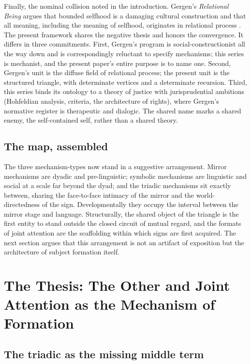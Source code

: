 Finally, the nominal collision noted in the introduction. Gergen's \emph{Relational Being} argues that bounded selfhood is a damaging cultural construction and that all meaning, including the meaning of selfhood, originates in relational process \parencite{gergen2009}. The present framework shares the negative thesis and honors the convergence. It differs in three commitments. First, Gergen's program is social-constructionist all the way down and is correspondingly reluctant to specify mechanisms; this series is mechanist, and the present paper's entire purpose is to name one. Second, Gergen's unit is the diffuse field of relational process; the present unit is the structured triangle, with determinate vertices and a determinate recursion. Third, this series binds its ontology to a theory of justice with jurisprudential ambitions (Hohfeldian analysis, criteria, the architecture of rights), where Gergen's normative register is therapeutic and dialogic. The shared name marks a shared enemy, the self-contained self, rather than a shared theory.

\subsection{The map, assembled}

The three mechanism-types now stand in a suggestive arrangement. Mirror mechanisms are dyadic and pre-linguistic; symbolic mechanisms are linguistic and social at a scale far beyond the dyad; and the triadic mechanisms sit exactly between, sharing the face-to-face intimacy of the mirror and the world-directedness of the sign. Developmentally they occupy the interval between the mirror stage and language. Structurally, the shared object of the triangle is the first entity to stand outside the closed circuit of mutual regard, and the formats of joint attention are the scaffolding within which signs are first acquired. The next section argues that this arrangement is not an artifact of exposition but the architecture of subject formation itself.

\section{The Thesis: The Other and Joint Attention as the Mechanism of Formation}
\label{p05:sec:thesis}

\subsection{The triadic as the missing middle term}

